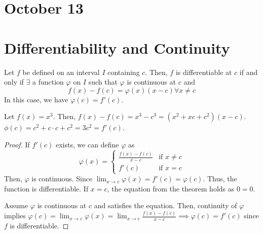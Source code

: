 \section{October 13}
\section{Differentiability and Continuity}

\begin{theorem}
    Let $f$ be defined on an interval $I$ containing $c$. Then, $f$ is differentiable at $c$ if and only if $\exists$ a function $\varphi$ on $I$ such that $\varphi$ is continuous at $c$ and $$f(x) - f(c) = \varphi(x)(x - c) \forall x \neq c$$ In this case, we have $\varphi(c) = f'(c)$.
\end{theorem}
\begin{note}
    Let $f(x) = x^3$. Then, $f(x) - f(c) = x^3 - c^3 = (x^2 + xc + c^2)(x - c)$. $\phi(c) = c^2 + c \cdot c + c^2 = 3c^2 = f'(c)$.
\end{note}
\begin{proof}
    If $f'(c)$ exists, we can define $\varphi$ as 
    $$\varphi(x) = 
    \begin{cases}
        \frac{f(x) - f(c)}{x - c} & \text{if } x \neq c \\
        f'(c) & \text{if } x = c
    \end{cases}$$
    Then, $\varphi$ is continuous. Since $\lim_{x \to c} \varphi(x) = f'(c) = \varphi(c)$. Thus, the function is differentiable. If $x = c$, the equation from the theorem holds as $0 = 0$.

    Assume $\varphi$ is continuous at $c$ and satisfies the equation. Then, continuity of $\varphi$ implies $\varphi(c) = \lim_{x \to c} \varphi(x) = \lim_{x \to c} \frac{f(x) - f(c)}{x - c} \implies \varphi(c) = f'(c)$ since $f$ is differentiable.
\end{proof}

